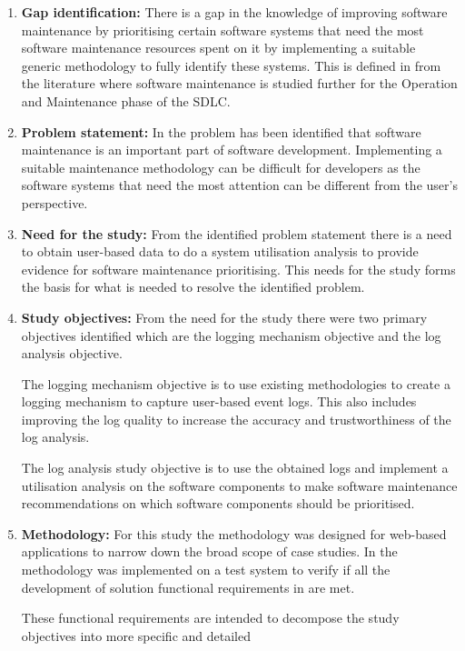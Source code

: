 \begin{enumerate}[label=\textbf{\Roman*.}]	
	\item \textbf{Gap identification:} There is a gap in the knowledge of improving software
	maintenance by prioritising certain software systems that need the most software maintenance
	resources spent on it by implementing a suitable generic methodology to fully identify these
	systems. This is defined in  from the literature where software maintenance is
	studied further for the Operation and Maintenance phase of the SDLC.
	\item \textbf{Problem statement:} In  the problem has been
	identified that software maintenance is an important part of software development. Implementing
	a suitable maintenance methodology can be difficult for developers as the software systems that
	need the most attention can be different from the user's perspective.  
	\item \textbf{Need for the study:} From the identified problem statement there is a need to
	obtain user-based data to do a system utilisation analysis to provide evidence for software
	maintenance prioritising. This needs for the study forms the basis for what is needed to resolve
	the identified problem.
	\item \textbf{Study objectives:} From the need for the study there were two primary objectives
	identified which are the logging mechanism objective and the log analysis objective.\par The
	logging mechanism objective is to use existing methodologies to create a logging mechanism to
	capture user-based event logs. This also includes improving the log quality to increase the
	accuracy and trustworthiness of the log analysis.\par The log analysis study objective is to use
	the obtained logs and implement a utilisation analysis on the software components to make
	software maintenance recommendations on which software components should be prioritised.
	\item \textbf{Methodology:} For this study the methodology was designed for web-based
	applications to narrow down the broad scope of case studies. In  the methodology
	was implemented on a test system to verify if all the development of solution functional
	requirements in  are met.\par These functional
	requirements are intended to decompose the study objectives into more specific and detailed

\end{enumerate}
